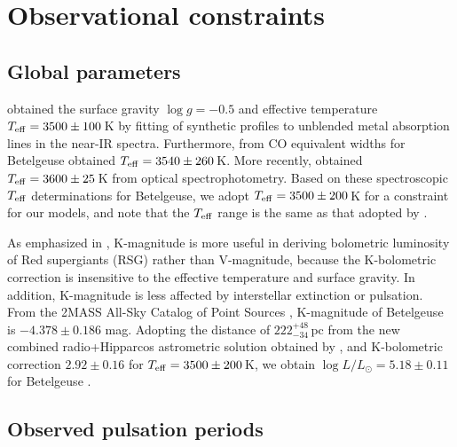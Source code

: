 \documentclass[fleqn,usenatbib]{mnras}
\begin{document}
\section{Observational constraints}

\subsection{Global parameters}

\citet{Lobel2000} obtained the surface gravity $\log g = -0.5$ and 
effective temperature $T_{\rm eff} = 3500\pm100$\,K by fitting of 
synthetic profiles to unblended metal absorption lines in the near-IR spectra.
Furthermore, from CO equivalent widths for Betelgeuse \citet{Carr2000} obtained 
$T_{\rm eff}=3540\pm260$\,K.
More recently, \citet{Levesque2020} obtained $T_{\rm eff} = 3600 \pm 25$\,K from
optical spectrophotometry.
Based on these spectroscopic $T_{\rm eff}$ determinations for Betelgeuse, we adopt
$T_{\rm eff} = 3500\pm200$\,K for a constraint for our models, and note that 
the $T_{\rm eff}$ range is the same as that adopted by \citet{Dolan2016}. 

As emphasized in \citet{Josselin2000}, K-magnitude is more useful in deriving 
bolometric luminosity of Red supergiants (RSG) rather than V-magnitude,
because the K-bolometric correction is insensitive to  
the effective temperature and surface gravity. 
In addition, K-magnitude is less affected by interstellar extinction or pulsation.
From the 2MASS All-Sky Catalog of Point Sources \citep{Cutri2003},
K-magnitude of Betelgeuse is $-4.378\pm0.186$ mag.
Adopting the distance of $222^{+48}_{-34}$\,pc from the new combined 
radio+Hipparcos astrometric solution obtained by \citet{Harper2017}, 
and K-bolometric correction  $2.92\pm0.16$ \citep{Levesque2005}
for $T_{\rm eff}=3500\pm200$\,K,
we obtain $\log L/L_\odot = 5.18 \pm 0.11$ for Betelgeuse \citep[which is similar
to $5.10\pm0.22$ adopted by][]{Dolan2016}.

\subsection{Observed pulsation periods}
\label{sec:puls} 
\end{document}
